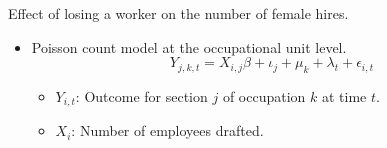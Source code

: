 \begin{frame}{Effect of losing a worker on the number of female hires.}
\begin{itemize}
    \item Poisson count model at the occupational unit level.
    \begin{equation*}
        Y_{j, k, t} = X_{i,j} \beta + \iota_j + \mu_k + \lambda_t + \epsilon_{i,t}
    \end{equation*}
    \begin{itemize}
        \item $Y_{i,t}$: Outcome for section $j$ of occupation $k$ at time $t$.

        \item $X_{i}$: Number of employees drafted.
    \end{itemize}

\end{itemize}
\end{frame}